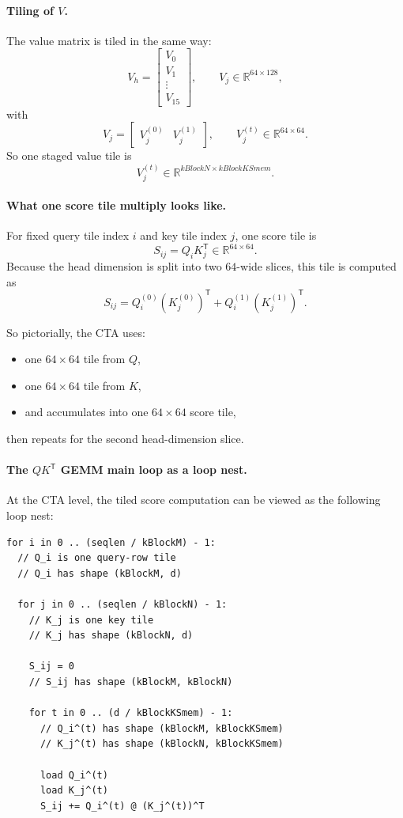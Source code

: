 \documentclass[11pt]{article}
\newcommand{\R}{\mathbb{R}}
\newcommand{\trans}{\mathsf{T}}
\begin{document}
\paragraph{Tiling of $V$.}
The value matrix is tiled in the same way:
\[
V_h =
\begin{bmatrix}
V_0 \\
V_1 \\
\vdots \\
V_{15}
\end{bmatrix},
\qquad
V_j \in \R^{64 \times 128},
\]
with
\[
V_j = \begin{bmatrix} V_j^{(0)} & V_j^{(1)} \end{bmatrix},
\qquad
V_j^{(t)} \in \R^{64 \times 64}.
\]
So one staged value tile is
\[
V_j^{(t)} \in \R^{kBlockN \times kBlockKSmem}.
\]

\paragraph{What one score tile multiply looks like.}
For fixed query tile index $i$ and key tile index $j$, one score tile is
\[
S_{ij} = Q_i K_j^\trans \in \R^{64 \times 64}.
\]
Because the head dimension is split into two $64$-wide slices, this tile is
computed as
\[
S_{ij}
=
Q_i^{(0)} \left(K_j^{(0)}\right)^\trans
+
Q_i^{(1)} \left(K_j^{(1)}\right)^\trans.
\]

So pictorially, the CTA uses:
\begin{itemize}
    \item one $64 \times 64$ tile from $Q$,
    \item one $64 \times 64$ tile from $K$,
    \item and accumulates into one $64 \times 64$ score tile,
\end{itemize}
then repeats for the second head-dimension slice.

\paragraph{The \texorpdfstring{$QK^\trans$}{QK^T} GEMM main loop as a loop nest.}
At the CTA level, the tiled score computation can be viewed as the following
loop nest:

\begin{verbatim}
for i in 0 .. (seqlen / kBlockM) - 1:
  // Q_i is one query-row tile
  // Q_i has shape (kBlockM, d)

  for j in 0 .. (seqlen / kBlockN) - 1:
    // K_j is one key tile
    // K_j has shape (kBlockN, d)

    S_ij = 0
    // S_ij has shape (kBlockM, kBlockN)

    for t in 0 .. (d / kBlockKSmem) - 1:
      // Q_i^(t) has shape (kBlockM, kBlockKSmem)
      // K_j^(t) has shape (kBlockN, kBlockKSmem)

      load Q_i^(t)
      load K_j^(t)
      S_ij += Q_i^(t) @ (K_j^(t))^T
\end{verbatim}
\end{document}
